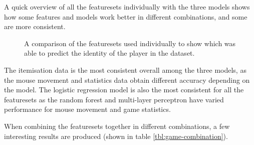 \documentclass[Report.tex]{subfiles}
\newcommand{\newaxis}[7]{
\begin{axis}[
    ybar,
    title={\textbf{#1}},
    ymin=#3, ymax=#4,
    bar width=1em,
    width={#5},
    height={#6},
    legend style={at={#7},anchor=north,legend columns=-1},
    enlarge x limits=0.4,
    x tick label style={align=center,text width=2cm},
    symbolic x coords={Logistic Regression, Random Forest, Multi-layer Perceptron},
    xtick=data,
    ylabel={#2}
]
}
\newcommand{\plotbar}[3] {
\addplot+[
	discard if not={features}{#1},
] table [x=model, y=#2, col sep=comma] {data/15-game-cv.csv};
\addlegendentry{#3}
}
\begin{document}
A quick overview of all the featuresets individually with the three models shows how some features and models work better in different combinations, and some are more consistent. 

\begin{figure}[H]
\centering
{}
\caption{A comparison of the featuresets used individually to show which was able to predict the identity of the player in the dataset. }
\end{figure}

The itemisation data is the most consistent overall among the three models, as the mouse movement and statistics data obtain different accuracy depending on the model. The logistic regression model is also the most consistent for all the featuresets as the random forest and multi-layer perceptron have varied performance for mouse movement and game statistics. 


When combining the featuresets together in different combinations, a few interesting results are produced (shown in table \ref{tbl:game-combination}).
\end{document}
